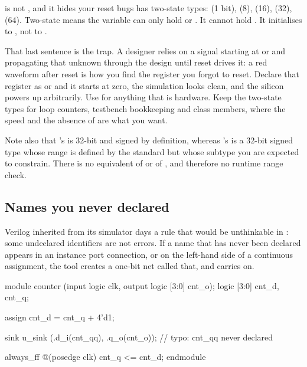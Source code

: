 \begin{gotcha}{ is not , and it hides your reset bugs}
\SV{} has two-state types:  (1 bit),  (8),  (16),
 (32),  (64). Two-state means the variable can only hold
 or . It cannot hold . It initialises to , not
to .

That last sentence is the trap. A \VHDL{} designer relies on a signal starting
at  or  and propagating that unknown through the design
until reset drives it: a red waveform after reset is how you find the register
you forgot to reset. Declare that register as  or  and it
starts at zero, the simulation looks clean, and the silicon powers up
arbitrarily. Use  for anything that is hardware. Keep the two-state
types for loop counters, testbench bookkeeping and class members, where the
speed and the absence of  are what you want.

Note also that \SV{}'s  is 32-bit and signed by definition, whereas
\VHDL{}'s  is a 32-bit signed type whose range is defined by the
standard but whose subtype you are expected to constrain. There is no \SV{}
equivalent of  or of , and therefore no
runtime range check.
\end{gotcha}

\subsection{Names you never declared}

Verilog inherited from its simulator days a
rule that would be unthinkable in \VHDL{}: some undeclared identifiers are not
errors. If a name that has never been declared appears in an instance port
connection, or on the left-hand side of a continuous assignment, the tool
creates a one-bit net called that, and carries on.

\begin{svcode}[caption={A typo that costs you an afternoon},label={lst:philosophy:implicit}]
module counter (input logic clk, output logic [3:0] cnt_o);
  logic [3:0] cnt_d, cnt_q;

  assign cnt_d = cnt_q + 4'd1;

  sink u_sink (.d_i(cnt_qq), .q_o(cnt_o));  // typo: cnt_qq never declared

  always_ff @(posedge clk) cnt_q <= cnt_d;
endmodule
\end{svcode}

